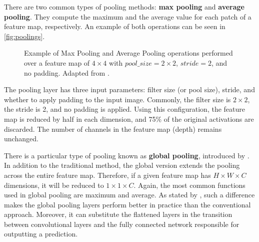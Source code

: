 There are two common types of pooling methods: \textbf{max pooling} and \textbf{average pooling}. They compute the maximum and the average value for each patch of a feature map, respectively. An example of both operations can be seen in \autoref{fig:poolings}.

\begin{figure}[ht]
\centering
{}
\hfill
{}    
\caption{Example of Max Pooling and Average Pooling operations performed over a feature map of $4 \times 4$ with $pool\_size=2 \times 2$, $stride=2$, and no padding. Adapted from \citep{guissousallaeddine2019}.}
\label{fig:poolings}
\end{figure}

The pooling layer has three input parameters: filter size (or pool size), stride, and whether to apply padding to the input image. Commonly, the filter size is $2 \times 2$, the stride is 2, and no padding is applied. Using this configuration, the feature map is reduced by half in each dimension, and 75\% of the original activations are discarded. The number of channels in the feature map (depth) remains unchanged.

There is a particular type of pooling known as \textbf{global pooling}, introduced by \cite{lin2013network}. In addition to the traditional method, the global version extends the pooling across the entire feature map. Therefore, if a given feature map has $H \times W \times C$ dimensions, it will be reduced to $1 \times 1 \times C$. Again, the most common functions used in global pooling are maximum and average. As stated by \cite{zhou2016learning}, such a difference makes the global pooling layers perform better in practice than the conventional approach. Moreover, it can substitute the flattened layers in the transition between convolutional layers and the fully connected network responsible for outputting a prediction.

